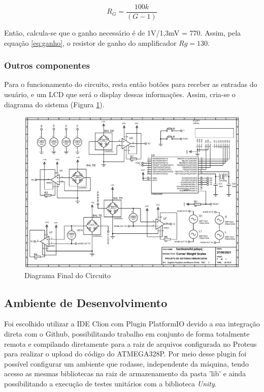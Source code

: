 \documentclass[a4paper, 12pt]{article}
\begin{document}
	\begin{equation}
		R_G = \dfrac{100k}{(G-1)}
		\label{eq:ganho}
	\end{equation}	



	Então, calcula-se que o ganho necessário é de 1V/1,3mV = 770. Assim, pela equação \ref{eq:ganho}, o resistor de ganho do amplificador $ Rg = 130 $. 
	
	
	\subsubsection{Outros componentes}
	
	Para o funcionamento do circuito, resta então botões para receber as entradas do usuário, e um LCD que será o display dessas informações. Assim, cria-se o diagrama do sistema (Figura \ref{fig:hardwarefinal}). 
	
	\begin{figure}[!htb]
		\centering
		\includegraphics[width=.85\linewidth]{hardwareA4}
		\caption{Diagrama Final do Circuito}
		\label{fig:hardwarefinal}
	\end{figure}
	
	\subsection{Ambiente de Desenvolvimento}
	
	Foi escolhido utilizar a IDE Clion com Plugin PlatformIO devido a sua integração direta com o Github, possibilitando trabalho em conjunto de forma totalmente remota e compilando diretamente para a raiz de arquivos configurada no Proteus para realizar o upload do código do ATMEGA328P. Por meio desse plugin foi possível configurar um ambiente que rodasse, independente da máquina, tendo acesso as mesmas bibliotecas na raiz de armazenamento da pasta 'lib' e ainda possibilitando a execução de testes unitários com a biblioteca \textit{Unity}. 
	
\end{document}
